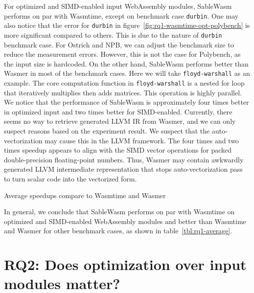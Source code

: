 For optimized and SIMD-enabled input WebAssembly modules, SableWasm performs on par with Wasmtime, except on benchmark case \texttt{durbin}. One may also notice that the error for \texttt{durbin} in figure~\ref{fig:rq1-wasmtime-opt-polybench} is more significant compared to others. This is due to the nature of \texttt{durbin} benchmark case. For Ostrich and NPB, we can adjust the benchmark size to reduce the measurement errors. However, this is not the case for Polybench, as the input size is hardcoded. On the other hand, SableWasm performs better than Wasmer in most of the benchmark cases. Here we will take \texttt{floyd-warshall} as an example. The core computation function in \texttt{floyd-warshall} is a nested for loop that iteratively multiplies then adds matrices. This operation is highly parallel. We notice that the performance of SableWasm is approximately four times better in optimized input and two times better for SIMD-enabled. Currently, there seems no way to retrieve generated LLVM IR from Wasmer, and we can only suspect reasons based on the experiment result. We suspect that the auto-vectorization may cause this in the LLVM framework. The four times and two times speedup appears to align with the SIMD vector operations for packed double-precision floating-point numbers. Thus, Wasmer may contain awkwardly generated LLVM intermediate representation that stops auto-vectorization pass to turn scalar code into the vectorized form.

\begin{table}
    \centering
    
    \caption{Average speedups compare to Wasmtime and Wasmer}
    \label{tbl:rq1-average}
\end{table}

In general, we conclude that SableWasm performs on par with Wasmtime on optimized and SIMD-enabled WebAssembly modules and better than Wasmtime and Wasmer for other benchmark cases, as shown in table~\ref{tbl:rq1-average}.


\section[RQ2: Does optimization over input modules matter?]{
  {\large RQ2: Does optimization over input modules matter?}}

